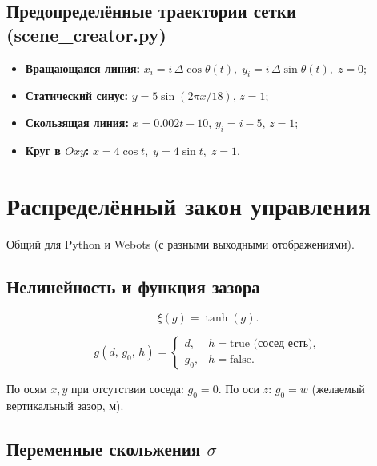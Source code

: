 \documentclass[a4paper,11pt]{article}
\begin{document}
\subsection{Предопределённые траектории сетки (scene\_creator.py)}

\begin{itemize}
  \item \textbf{Вращающаяся линия:}
  $x_i = i\,\Delta\cos\theta(t),\; y_i = i\,\Delta\sin\theta(t),\; z=0$;
  \item \textbf{Статический синус:}
  $y = 5\sin(2\pi x/18)$, $z=1$;
  \item \textbf{Скользящая линия:}
  $x = 0.002t - 10$, $y_i = i - 5$, $z=1$;
  \item \textbf{Круг в $Oxy$:}
  $x = 4\cos t,\; y = 4\sin t,\; z=1$.
\end{itemize}

\section{Распределённый закон управления}

Общий для Python и Webots (с разными выходными отображениями).

\subsection{Нелинейность и функция зазора}

\begin{equation}
  \xi(g) = \tanh(g).
  \label{eq:xi}
\end{equation}

\begin{equation}
  g(d,\, g_0,\, h) =
  \begin{cases}
    d,   & h = \text{true (сосед есть)}, \\
    g_0, & h = \text{false}.
  \end{cases}
  \label{eq:g}
\end{equation}

По осям $x,y$ при отсутствии соседа: $g_0 = 0$.
По оси $z$: $g_0 = w$ (желаемый вертикальный зазор, м).

\subsection{Переменные скольжения $\sigma$}
\end{document}
